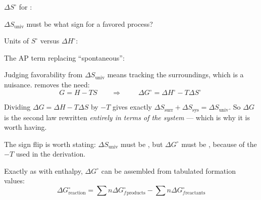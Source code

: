 \documentclass{apchem-notes}
\begin{document}

\begin{warmup}[4]
  \item $\Delta S^\circ$ for :
  \item $\Delta S_{\text{univ}}$ must be what sign for a favored process?
  \item Units of $S^\circ$ versus $\Delta H^\circ$:
  \item The AP term replacing ``spontaneous'':
\end{warmup}



Judging favorability from $\Delta S_{\text{univ}}$ means tracking the
surroundings, which is a nuisance.  removes the
need:
\[ G = H - TS \qquad\Longrightarrow\qquad
   \boxed{\;\Delta G^\circ = \Delta H^\circ - T\Delta S^\circ\;} \]

Dividing $\Delta G = \Delta H - T\Delta S$ by $-T$ gives exactly
$\Delta S_{\text{surr}} + \Delta S_{\text{sys}} = \Delta S_{\text{univ}}$.
So $\Delta G$ is the second law rewritten \emph{entirely in terms of the
system} --- which is why it is worth having.

\begin{center}
\end{center}

The sign flip is worth stating: $\Delta S_{\text{univ}}$ must be
, but $\Delta G^\circ$ must be
, because of the $-T$ used in the derivation.


Exactly as with enthalpy, $\Delta G^\circ$ can be assembled from tabulated
formation values:
\[ \Delta G^\circ_{\text{reaction}} =
   \sum n\Delta G_f^\circ{}_{\text{products}}
   - \sum n\Delta G_f^\circ{}_{\text{reactants}} \]
\end{document}
